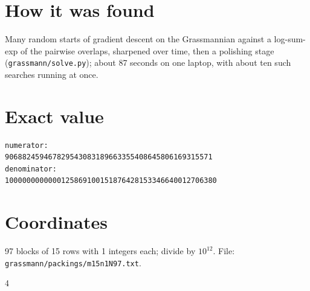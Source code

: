 \documentclass[11pt,a4paper]{article}
\begin{document}
\section{How it was found}
Many random starts of gradient descent on the Grassmannian against a log-sum-exp of the pairwise overlaps, sharpened over time, then a polishing stage (\texttt{grassmann/solve.py}); about 87 seconds on one laptop, with about ten such searches running at once.


\appendix
\section{Exact value}
{\small
\begin{verbatim}
numerator:
906882459467829543083189663355408645806169315571
denominator:
1000000000000125869100151876428153346640012706380
\end{verbatim}}

\section{Coordinates}
97 blocks of 15 rows with 1 integers each; divide by $10^{12}$. File: \texttt{grassmann/packings/m15n1N97.txt}.
{\tiny
\begin{multicols}{4}
\end{multicols}}
\end{document}
